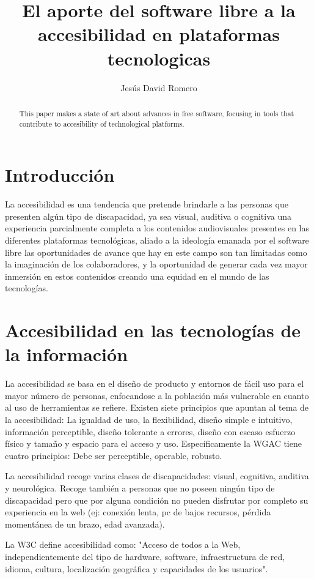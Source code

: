 \documentclass[a4paper]{article}
\title{El aporte del software libre a la accesibilidad en plataformas tecnologicas}
\author{Jesús David Romero}
\begin{document}
\maketitle


\begin{abstract}
This paper makes a state of art about advances in free software, focusing in tools that contribute to accesibility of technological platforms.
\end{abstract}

\section{Introducción}
La accesibilidad es una tendencia que pretende brindarle a las personas que presenten algún tipo de discapacidad, ya sea visual, auditiva o cognitiva una experiencia parcialmente completa a los contenidos audiovisuales presentes en las diferentes plataformas tecnológicas, aliado a la ideología emanada por el software libre las oportunidades de avance que hay en este campo son tan limitadas como la imaginación de los colaboradores, y la oportunidad de generar cada vez mayor inmersión en estos contenidos creando una equidad en el mundo de las tecnologías.

\section{Accesibilidad en las tecnologías de la información}
La accesibilidad se basa en el diseño de producto y entornos de fácil uso para el mayor número de personas, enfocandose a la población más vulnerable en cuanto al uso de herramientas se refiere. Existen siete principios que apuntan al tema de la accesibilidad: La igualdad de uso, la flexibilidad, diseño simple e intuitivo, información perceptible, diseño tolerante a errores, diseño con escaso esfuerzo físico y tamaño y espacio para el acceso y uso.
Específicamente la WGAC tiene cuatro principios: Debe ser perceptible, operable, robusto.

La accesibilidad recoge varias clases de discapacidades: visual, cognitiva, auditiva y neurológica. Recoge también a personas que no poseen ningún tipo de discapacidad pero que por alguna condición no pueden disfrutar por completo su experiencia en la web (ej: conexión lenta, pc de bajos recursos, pérdida momentánea de un brazo, edad avanzada).

La W3C define accesibilidad como: "Acceso de todos a la Web, independientemente del tipo de hardware, software, infraestructura de red, idioma, cultura, localización geográfica y capacidades de los usuarios".
\end{document}
